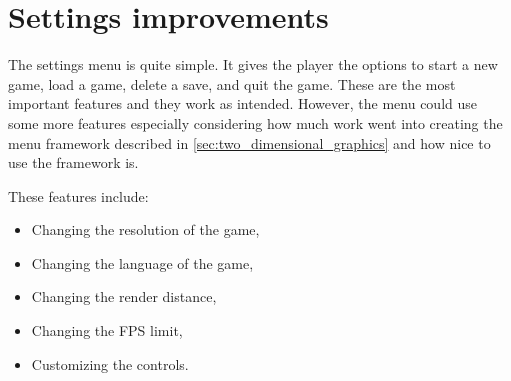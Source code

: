 \section{Settings improvements}
The settings menu is quite simple.
It gives the player the options to start a new game, load a game, delete a save, and quit the game.
These are the most important features and they work as intended.
However, the menu could use some more features especially considering how much work went into creating the menu framework described in \autoref{sec:two_dimensional_graphics} and how nice to use the framework is.

These features include:
\begin{itemize}
    \item Changing the resolution of the game,
    \item Changing the language of the game,
    \item Changing the render distance,
    \item Changing the FPS limit,
    \item Customizing the controls.
\end{itemize}